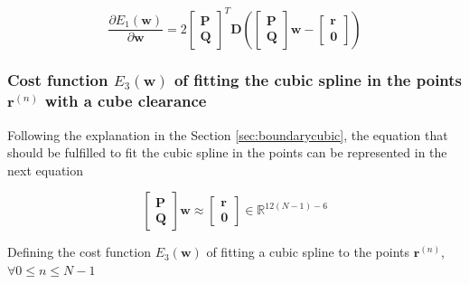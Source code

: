 \begin{equation}\label{eq:DE1}
\frac{\partial E_{1}(\mathbf{w})}{\partial \mathbf{w}}
=
2
\begin{bmatrix}
\mathbf{P}\\
\mathbf{Q}
\end{bmatrix}^{T}
\mathbf{D}
\left(
\begin{bmatrix}
\mathbf{P}\\
\mathbf{Q}
\end{bmatrix}
\mathbf{w}
-
\begin{bmatrix}
\mathbf{r}\\
\mathbf{0}
\end{bmatrix}
\right)
\end{equation}


\subsubsection{Cost function $E_{3}(\mathbf{w})$ of fitting the cubic spline in the points $\mathbf{r}^{(n)}$ with a cube clearance}

Following the explanation in the Section \ref{sec:boundarycubic},
the equation that should be fulfilled to fit the cubic spline in the points can be represented in the next equation

\begin{equation}
\begin{bmatrix}
\mathbf{P}\\
\mathbf{Q}
\end{bmatrix}
\mathbf{w}
\approx
\begin{bmatrix}
\mathbf{r}\\
\mathbf{0}
\end{bmatrix}
\in \mathbb{R}^{12(N-1)-6}
\end{equation}

Defining the cost function $E_{3}(\mathbf{w})$ of fitting a cubic spline to the points $\mathbf{r}^{(n)}$,
$\forall 0\leq n\leq N-1$


